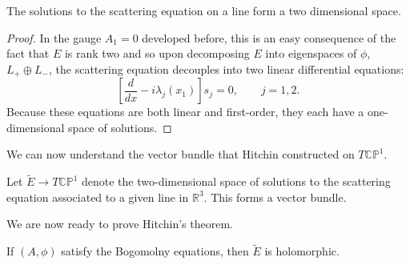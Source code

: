 	\begin{prop}
		The solutions to the scattering equation on a line form a two dimensional space.
	\end{prop}
	\begin{proof}
		In the gauge $A_1 = 0$ developed before, this is an easy consequence of the fact that $E$ is rank two and so upon decomposing $E$ into eigenspaces of $\phi$,  $L_+ \oplus L_-$, the scattering equation decouples into two linear differential equations:
		\begin{equation}
			\left[\frac{d}{dx} - i\lambda_j(x_1)\right] s_j = 0, \qquad j = 1,2.
		\end{equation}
		Because these equations are both linear and first-order, they each have a one-dimensional space of solutions.
	\end{proof}
	We can now understand the vector bundle that Hitchin constructed on $T \mathbb{CP}^1$.
	\begin{obs}
		Let $\tilde E \to T \mathbb{CP}^1$ denote the two-dimensional space of solutions to the scattering equation associated to a given line in $\mathbb R^3$. This forms a vector bundle.
	\end{obs}
	We are now ready to prove Hitchin's theorem.
	\begin{prop}
		If $(A, \phi)$ satisfy the Bogomolny equations, then $\tilde E$ is holomorphic.
	\end{prop}
